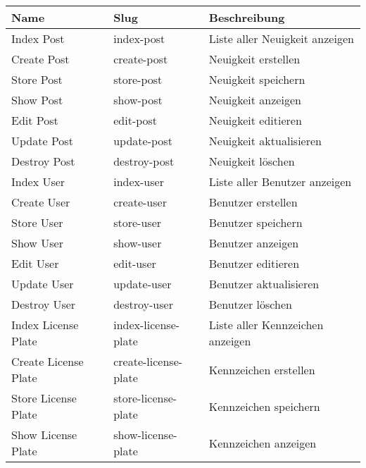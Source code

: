 \begin{longtable}[c]{@{}lll@{}}
  \toprule
  \textbf{Name}         & \textbf{Slug}         & \textbf{Beschreibung}              \\* \midrule
  \endfirsthead
  \endhead
  \bottomrule
  \endfoot
  \endlastfoot
  Index Post            & index-post            & Liste aller Neuigkeit anzeigen     \\
  Create Post           & create-post           & Neuigkeit erstellen                \\
  Store Post            & store-post            & Neuigkeit speichern                \\
  Show Post             & show-post             & Neuigkeit anzeigen                 \\
  Edit Post             & edit-post             & Neuigkeit editieren                \\
  Update Post           & update-post           & Neuigkeit aktualisieren            \\
  Destroy Post          & destroy-post          & Neuigkeit löschen                  \\
  Index User            & index-user            & Liste aller Benutzer anzeigen      \\
  Create User           & create-user           & Benutzer erstellen                 \\
  Store User            & store-user            & Benutzer speichern                 \\
  Show User             & show-user             & Benutzer anzeigen                  \\
  Edit User             & edit-user             & Benutzer editieren                 \\
  Update User           & update-user           & Benutzer aktualisieren             \\
  Destroy User          & destroy-user          & Benutzer löschen                   \\
  Index License Plate   & index-license-plate   & Liste aller Kennzeichen anzeigen   \\
  Create License Plate  & create-license-plate  & Kennzeichen erstellen              \\
  Store License Plate   & store-license-plate   & Kennzeichen speichern              \\
  Show License Plate    & show-license-plate    & Kennzeichen anzeigen               \\

\end{longtable}
